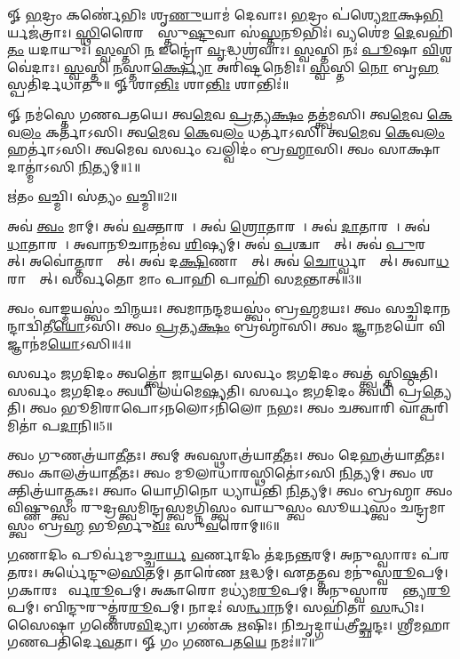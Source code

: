


𑍐 \ul{𑌭}𑌦𑍍𑌰𑌂 𑌕𑌰𑍍𑌣𑍇॑𑌭𑌿𑌃 𑌶𑍃\ul{𑌣𑍁}𑌯𑌾𑌮॑ 𑌦𑍇𑌵𑌾𑌃। \ul{𑌭}𑌦𑍍𑌰𑌂 𑌪॑𑌶𑍍𑌯𑍇\ul{𑌮𑌾}𑌕𑍍𑌷\ul{𑌭𑌿}𑌰𑍍𑌯𑌜॑𑌤𑍍𑌰𑌾𑌃। 
\ul{𑌸𑍍𑌥𑌿}𑌰𑍈𑌰𑌙𑍍𑌗𑍈᳚𑌸𑍍𑌤𑍁\ul{𑌷𑍍𑌟𑍁}𑌵𑌾 𑌸॑\ul{𑌸𑍍𑌤}𑌨𑍂𑌭𑌿𑌃॑। 𑌵𑍍𑌯𑌶𑍇॑𑌮 \ul{𑌦𑍇}𑌵𑌹𑌿॑\ul{𑌤𑌂} 𑌯𑌦𑌾𑌯𑍁𑌃॑। 
\ul{𑌸𑍍𑌵}𑌸𑍍𑌤𑌿 \ul{𑌨} 𑌇𑌨𑍍𑌦𑍍𑌰𑍋॑ \ul{𑌵𑍃}𑌦𑍍𑌧𑌶𑍍𑌰॑𑌵𑌾𑌃। \ul{𑌸𑍍𑌵}𑌸𑍍𑌤𑌿 𑌨𑌃॑ \ul{𑌪𑍂}𑌷𑌾 \ul{𑌵𑌿}𑌶𑍍𑌵𑌵𑍇॑𑌦𑌾𑌃। 
\ul{𑌸𑍍𑌵}𑌸𑍍𑌤𑌿 \ul{𑌨}𑌸𑍍𑌤𑌾\ul{𑌰𑍍𑌕𑍍𑌷𑍍𑌯𑍋} 𑌅𑌰𑌿॑𑌷𑍍𑌟𑌨𑍇𑌮𑌿𑌃। \ul{𑌸𑍍𑌵}𑌸𑍍𑌤𑌿 \ul{𑌨𑍋} 𑌬𑍃\ul{𑌹}𑌸𑍍𑌪𑌤𑌿॑𑌰𑍍𑌦𑌧𑌾𑌤𑍁॥
𑍐 𑌶𑌾\ul{𑌨𑍍𑌤𑌿𑌃} 𑌶𑌾\ul{𑌨𑍍𑌤𑌿𑌃} 𑌶𑌾𑌨𑍍𑌤𑌿𑌃॑॥

𑍐 𑌨𑌮॑𑌸𑍍𑌤𑍇 𑌗𑌣𑌪𑌤𑌯𑍇। 𑌤𑍍𑌵\ul{𑌮𑍇}𑌵 \ul{𑌪𑍍𑌰}𑌤𑍍𑌯\ul{𑌕𑍍𑌷𑌂} 𑌤𑌤𑍍𑌤𑍍𑌵॑𑌮𑌸𑌿।
𑌤𑍍𑌵\ul{𑌮𑍇}𑌵 \ul{𑌕𑍇}𑌵\ul{𑌲𑌂} 𑌕𑌰𑍍𑌤𑌾॑𑌽𑌸𑌿। 𑌤𑍍𑌵\ul{𑌮𑍇}𑌵 \ul{𑌕𑍇}𑌵\ul{𑌲𑌂} 𑌧𑌰𑍍𑌤𑌾॑𑌽𑌸𑌿।  𑌤𑍍𑌵\ul{𑌮𑍇}𑌵 \ul{𑌕𑍇}𑌵\ul{𑌲𑌂} 𑌹𑌰𑍍𑌤𑌾॑𑌽𑌸𑌿।
𑌤𑍍𑌵𑌮𑍇𑌵 𑌸𑌰𑍍𑌵𑌂 𑌖𑌲𑍍𑌵𑌿𑌦𑌂॑ 𑌬𑍍𑌰\ul{𑌹𑍍𑌮𑌾}𑌸𑌿।  𑌤𑍍𑌵𑌂 𑌸𑌾𑌕𑍍𑌷𑌾𑌦𑌾𑌤𑍍𑌮𑌾॑𑌽𑌸𑌿 \ul{𑌨𑌿}𑌤𑍍𑌯𑌮𑍍॥1॥

𑌋॑𑌤𑌂 \ul{𑌵}𑌚𑍍𑌮𑌿। 𑌸॑𑌤𑍍𑌯𑌂 \ul{𑌵}𑌚𑍍𑌮𑌿॥2॥

𑌅𑌵॑ \ul{𑌤𑍍𑌵𑌂} 𑌮𑌾𑌮𑍍।  𑌅𑌵॑ \ul{𑌵}𑌕𑍍𑌤𑌾𑌰𑌮𑍍᳚। 𑌅𑌵॑ \ul{𑌶𑍍𑌰𑍋}𑌤𑌾𑌰𑌮𑍍᳚। 𑌅𑌵॑ \ul{𑌦𑌾}𑌤𑌾𑌰𑌮𑍍᳚।  𑌅𑌵॑ \ul{𑌧𑌾}𑌤𑌾𑌰𑌮𑍍᳚।
𑌅𑌵𑌾𑌨𑍂𑌚𑌾𑌨𑌮॑𑌵 \ul{𑌶𑌿}𑌷𑍍𑌯𑌮𑍍। 𑌅𑌵॑ \ul{𑌪}𑌶𑍍𑌚𑌾𑌤𑍍𑌤𑌾᳚𑌤𑍍।  𑌅𑌵॑ \ul{𑌪𑍁}𑌰𑌸𑍍𑌤𑌾᳚𑌤𑍍। 𑌅𑌵𑍋॑\ul{𑌤𑍍𑌤}𑌰𑌾𑌤𑍍𑌤𑌾᳚𑌤𑍍।
𑌅𑌵॑ 𑌦\ul{𑌕𑍍𑌷𑌿}𑌣𑌾𑌤𑍍𑌤𑌾᳚𑌤𑍍। 𑌅𑌵॑ \ul{𑌚𑍋}𑌰𑍍𑌧𑍍𑌵𑌾𑌤𑍍𑌤𑌾᳚𑌤𑍍।  𑌅𑌵𑌾\ul{𑌧}𑌰𑌾𑌤𑍍𑌤𑌾᳚𑌤𑍍।
𑌸𑌰𑍍𑌵𑌤𑍋 𑌮𑌾𑌂 𑌪𑌾𑌹𑌿 𑌪𑌾𑌹𑌿॑ 𑌸\ul{𑌮}𑌨𑍍𑌤𑌾𑌤𑍍॥3॥

𑌤𑍍𑌵𑌂 𑌵𑌾𑌙𑍍𑌮𑌯𑌸𑍍𑌤𑍍𑌵𑌂॑ 𑌚𑌿\ul{𑌨𑍍𑌮}𑌯𑌃। 𑌤𑍍𑌵𑌮𑌾𑌨𑌨𑍍𑌦𑌮𑌯𑌸𑍍𑌤𑍍𑌵𑌂॑ 𑌬𑍍𑌰\ul{𑌹𑍍𑌮}𑌮𑌯𑌃।  𑌤𑍍𑌵𑌂 𑌸𑌚𑍍𑌚𑌿𑌦𑌾𑌨𑌨𑍍𑌦𑌾𑌦𑍍𑌵𑌿॑𑌤𑍀\ul{𑌯𑍋}𑌽𑌸𑌿।
𑌤𑍍𑌵𑌂 \ul{𑌪𑍍𑌰}𑌤𑍍𑌯\ul{𑌕𑍍𑌷𑌂} 𑌬𑍍𑌰𑌹𑍍𑌮𑌾॑𑌸𑌿।  𑌤𑍍𑌵𑌂 𑌜𑍍𑌞𑌾𑌨𑌮𑌯𑍋 𑌵𑌿𑌜𑍍𑌞𑌾𑌨॑𑌮\ul{𑌯𑍋}𑌽𑌸𑌿॥4॥

𑌸𑌰𑍍𑌵𑌂 𑌜𑌗𑌦𑌿𑌦𑌂 𑌤𑍍𑌵𑌤𑍍𑌤𑍍𑌵𑍋॑ 𑌜𑌾\ul{𑌯}𑌤𑍇। 𑌸𑌰𑍍𑌵𑌂 𑌜𑌗𑌦𑌿𑌦𑌂 𑌤𑍍𑌵𑌤𑍍𑌤𑍍𑌵॑𑌸𑍍𑌤𑌿\ul{𑌷𑍍𑌠}𑌤𑌿।
𑌸𑌰𑍍𑌵𑌂 𑌜𑌗𑌦𑌿𑌦𑌂 𑌤𑍍𑌵𑌯𑌿 𑌲𑌯॑𑌮𑍇\ul{𑌷𑍍𑌯}𑌤𑌿। 𑌸𑌰𑍍𑌵𑌂 𑌜𑌗𑌦𑌿𑌦𑌂 𑌤𑍍𑌵𑌯𑌿॑ 𑌪𑍍𑌰\ul{𑌤𑍍𑌯𑍇}𑌤𑌿।
𑌤𑍍𑌵𑌂 𑌭𑍂𑌮𑌿𑌰𑌾𑌪𑍋𑌽𑌨𑌲𑍋𑌽𑌨𑌿॑𑌲𑍋 \ul{𑌨}𑌭𑌃।  𑌤𑍍𑌵𑌂 𑌚𑌤𑍍𑌵𑌾𑌰𑌿 𑌵𑌾𑌕𑍍𑌪𑌰𑌿𑌮𑌿𑌤𑌾॑ 𑌪\ul{𑌦𑌾}𑌨𑌿॥5॥

𑌤𑍍𑌵𑌂 𑌗𑍁𑌣𑌤𑍍𑌰॑𑌯𑌾\ul{𑌤𑍀}𑌤𑌃।  𑌤𑍍𑌵𑌮𑍍 𑌅𑌵𑌸𑍍𑌥𑌾𑌤𑍍𑌰॑𑌯𑌾\ul{𑌤𑍀}𑌤𑌃। 𑌤𑍍𑌵𑌂 𑌦𑍇𑌹𑌤𑍍𑌰॑𑌯𑌾\ul{𑌤𑍀}𑌤𑌃।
𑌤𑍍𑌵𑌂 𑌕𑌾𑌲𑌤𑍍𑌰॑𑌯𑌾\ul{𑌤𑍀}𑌤𑌃। 𑌤𑍍𑌵𑌂 𑌮𑍂𑌲𑌾𑌧𑌾𑌰𑌸𑍍𑌥𑌿𑌤𑍋॑𑌽𑌸𑌿 \ul{𑌨𑌿}𑌤𑍍𑌯𑌮𑍍। 𑌤𑍍𑌵𑌂 𑌶𑌕𑍍𑌤𑌿𑌤𑍍𑌰॑𑌯𑌾\ul{𑌤𑍍𑌮}𑌕𑌃।
𑌤𑍍𑌵𑌾𑌂 𑌯𑍋𑌗𑌿𑌨𑍋 𑌧𑍍𑌯𑌾𑌯॑𑌨𑍍𑌤𑌿 \ul{𑌨𑌿}𑌤𑍍𑌯𑌮𑍍।  𑌤𑍍𑌵𑌂 𑌬𑍍𑌰𑌹𑍍𑌮𑌾 𑌤𑍍𑌵𑌂 𑌵𑌿𑌷𑍍𑌣𑍁𑌸𑍍𑌤𑍍𑌵𑌂 𑌰𑍁𑌦𑍍𑌰𑌸𑍍𑌤𑍍𑌵𑌮𑌿𑌨𑍍𑌦𑍍𑌰𑌸𑍍𑌤𑍍𑌵𑌮𑌗𑍍𑌨𑌿𑌸𑍍𑌤𑍍𑌵𑌂
𑌵𑌾𑌯𑍁𑌸𑍍𑌤𑍍𑌵𑌂 𑌸𑍂𑌰𑍍𑌯𑌸𑍍𑌤𑍍𑌵𑌂 𑌚𑌨𑍍𑌦𑍍𑌰𑌮𑌾𑌸𑍍𑌤𑍍𑌵𑌂 𑌬𑍍𑌰\ul{𑌹𑍍𑌮} 𑌭𑍂𑌰𑍍𑌭𑍁\ul{𑌵𑌃} 𑌸𑍁\ul{𑌵}𑌰𑍋𑌮𑍍॥6॥

\ul{𑌗}𑌣𑌾𑌦𑌿𑌂 𑌪𑍂𑌰𑍍𑌵॑𑌮𑍁\ul{𑌚𑍍𑌚𑌾}\ul{𑌰𑍍𑌯} \ul{𑌵}𑌰𑍍𑌣𑌾𑌦𑌿𑌂 𑌤॑𑌦𑌨\ul{𑌨𑍍𑌤}𑌰𑌮𑍍। 𑌅𑌨𑍁𑌸𑍍𑌵𑌾𑌰𑌃 𑌪॑𑌰\ul{𑌤}𑌰𑌃। 𑌅𑌰𑍍𑌧𑍇॑𑌨𑍍𑌦𑍁𑌲\ul{𑌸𑌿}𑌤𑌮𑍍।
𑌤𑌾𑌰𑍇॑𑌣 \ul{𑌋}𑌦𑍍𑌧𑌮𑍍।  𑌏𑌤𑌤𑍍𑌤𑌵 𑌮𑌨𑍁॑𑌸𑍍𑌵\ul{𑌰𑍂}𑌪𑌮𑍍। 𑌗𑌕𑌾𑌰𑌃 𑌪𑍂᳚𑌰𑍍𑌵\ul{𑌰𑍂}𑌪𑌮𑍍।  𑌅𑌕𑌾𑌰𑍋 𑌮𑌧𑍍𑌯॑𑌮\ul{𑌰𑍂}𑌪𑌮𑍍।
𑌅𑌨𑍁𑌸𑍍𑌵𑌾𑌰𑌶𑍍𑌚𑌾᳚𑌨𑍍𑌤𑍍𑌯\-\ul{𑌰𑍂}𑌪𑌮𑍍।  𑌬𑌿𑌨𑍍𑌦𑍁𑌰𑍁𑌤𑍍𑌤॑𑌰\ul{𑌰𑍂}𑌪𑌮𑍍। 𑌨𑌾𑌦𑌃॑ 𑌸\ul{𑌨𑍍𑌧𑌾}𑌨𑌮𑍍।  𑌸𑌹𑌿॑𑌤𑌾 \ul{𑌸}𑌨𑍍𑌧𑌿𑌃। 
𑌸𑍈𑌷𑌾 𑌗𑌣𑍇॑𑌶\ul{𑌵𑌿}𑌦𑍍𑌯𑌾। 𑌗𑌣॑𑌕 \ul{𑌋}𑌷𑌿𑌃। 𑌨𑌿𑌚𑍃𑌦𑍍𑌗𑌾𑌯॑𑌤𑍍𑌰𑍀\ul{𑌚𑍍𑌛}𑌨𑍍𑌦𑌃।
𑌶𑍍𑌰𑍀𑌮𑌹𑌾𑌗𑌣𑌪𑌤𑌿॑𑌰𑍍𑌦𑍇\ul{𑌵}𑌤𑌾। 𑍐 𑌗𑌂 𑌗𑌣𑌪𑌤\ul{𑌯𑍇} 𑌨𑌮𑌃॑॥7॥

